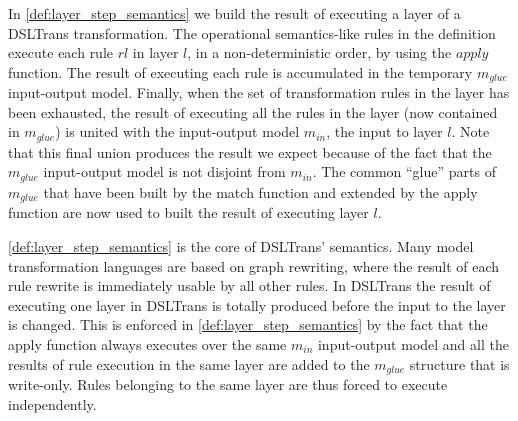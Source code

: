 

In \cref{def:layer_step_semantics} we build the result of executing a layer of a DSLTrans transformation. The operational semantics-like rules in the definition execute each rule $rl$ in layer $l$, in a non-deterministic order, by using the $apply$ function. The result of executing each rule is accumulated in the temporary $m_{glue}$ input-output model. Finally, when the set of transformation rules in the layer has been exhausted, the result of executing all the rules in the layer (now contained in $m_{glue}$) is united with the input-output model $m_{in}$, the input to layer $l$. Note that this final union produces the result we expect because of the fact that the $m_{glue}$ input-output model is not disjoint from $m_{in}$. The common ``glue'' parts of $m_{glue}$ that have been built by the match function and extended by the apply function are now used to built the result of executing layer $l$.

\cref{def:layer_step_semantics} is the core of DSLTrans' semantics. Many model transformation languages are based on graph rewriting, where the result of each rule rewrite is immediately usable by all other rules. In DSLTrans the result of executing one layer in DSLTrans is totally produced before the input to the layer is changed. This is enforced in \cref{def:layer_step_semantics} by the fact that the apply function always executes over the same $m_{in}$ input-output model and all the results of rule execution in the same layer are added to the $m_{glue}$ structure that is write-only. Rules belonging to the same layer are thus forced to execute independently.


